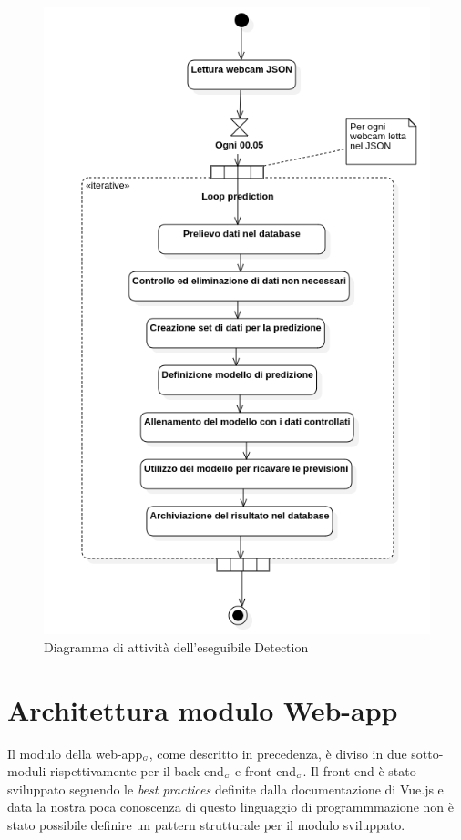 \begin{figure}[H]
  \begin{center}
    \includegraphics[scale=0.6]{../immagini/diag_PB/prediction_activity.png}
    \caption{Diagramma di attività dell'eseguibile Detection}
  \end{center}
\end{figure}



\section{Architettura modulo Web-app}\label{ArchitetturaModuloWebApp}
Il modulo della web-app$_{\scaleto{G}{3pt}}$, come descritto in precedenza, è diviso in due sotto-moduli rispettivamente per il back-end$_{\scaleto{G}{3pt}}$ e front-end$_{\scaleto{G}{3pt}}$.
Il front-end è stato sviluppato seguendo le \textit{best practices} definite dalla documentazione di Vue.js e data la nostra poca conoscenza di questo linguaggio di programmmazione non è stato possibile definire un pattern strutturale per il modulo sviluppato. 
